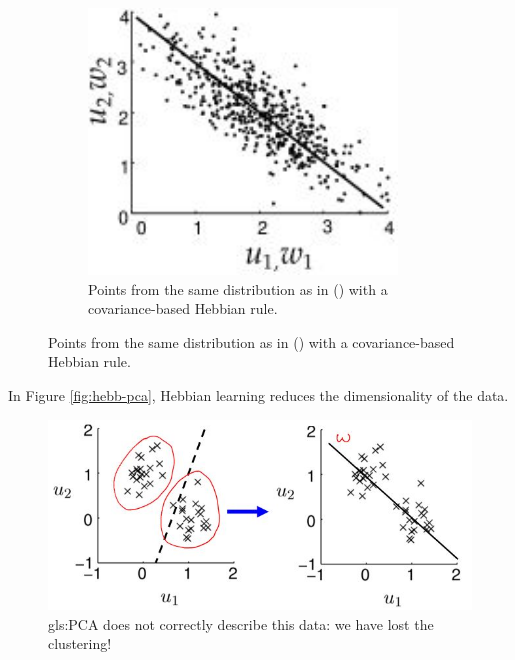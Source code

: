 \documentclass[]{article}
\begin{document}
\begin{figure}[H]
\begin{subfigure}[b]{0.3\textwidth}
	\end{subfigure}
	\begin{subfigure}[b]{0.3\textwidth}
		\begin{center}
			\caption{Points from the same distribution as in () with a covariance-based Hebbian rule.}
			\includegraphics[width=0.9\textwidth]{hebb-pca3}
		\end{center}
	\end{subfigure}
\end{figure}

In Figure \ref{fig:hebb-pca}, Hebbian learning reduces the dimensionality of the data.

\begin{figure}[H]
	\caption[\gls{gls:PCA} does not correctly describe this data]{\gls{gls:PCA} does not correctly describe this data: we have lost the clustering!}
	\includegraphics[width=\textwidth]{pca-does-not-correctly-describe-this-data}
\end{figure}
\end{document}
